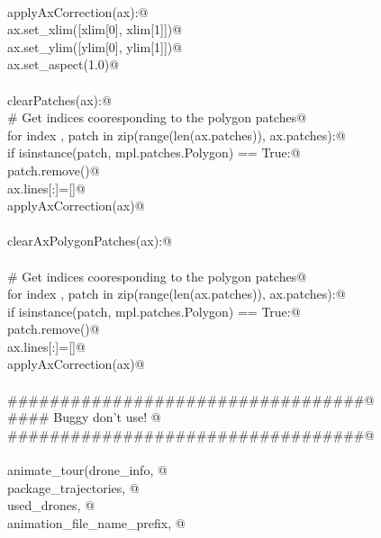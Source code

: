 \documentclass[10.0pt]{report}
\begin{document}
\begin{appendices}
\begin{flushleft}
\begin{list}{}{}
\mbox{}\verb@@\\
\mbox{}\verb@def applyAxCorrection(ax):@\\
\mbox{}\verb@      ax.set_xlim([xlim[0], xlim[1]])@\\
\mbox{}\verb@      ax.set_ylim([ylim[0], ylim[1]])@\\
\mbox{}\verb@      ax.set_aspect(1.0)@\\
\mbox{}\verb@@\\
\mbox{}\verb@def clearPatches(ax):@\\
\mbox{}\verb@    # Get indices cooresponding to the polygon patches@\\
\mbox{}\verb@    for index , patch in zip(range(len(ax.patches)), ax.patches):@\\
\mbox{}\verb@        if isinstance(patch, mpl.patches.Polygon) == True:@\\
\mbox{}\verb@            patch.remove()@\\
\mbox{}\verb@    ax.lines[:]=[]@\\
\mbox{}\verb@    applyAxCorrection(ax)@\\
\mbox{}\verb@@\\
\mbox{}\verb@def clearAxPolygonPatches(ax):@\\
\mbox{}\verb@@\\
\mbox{}\verb@    # Get indices cooresponding to the polygon patches@\\
\mbox{}\verb@    for index , patch in zip(range(len(ax.patches)), ax.patches):@\\
\mbox{}\verb@        if isinstance(patch, mpl.patches.Polygon) == True:@\\
\mbox{}\verb@            patch.remove()@\\
\mbox{}\verb@    ax.lines[:]=[]@\\
\mbox{}\verb@    applyAxCorrection(ax)@\\
\mbox{}\verb@@\\
\mbox{}\verb@##################################@\\
\mbox{}\verb@#### Buggy don't use! @\\
\mbox{}\verb@##################################@\\
\mbox{}\verb@@\\
\mbox{}\verb@def animate_tour(drone_info, @\\
\mbox{}\verb@                 package_trajectories, @\\
\mbox{}\verb@                 used_drones, @\\
\mbox{}\verb@                 animation_file_name_prefix, @\\

\end{list}
\end{flushleft}
\end{appendices}
\end{document}
